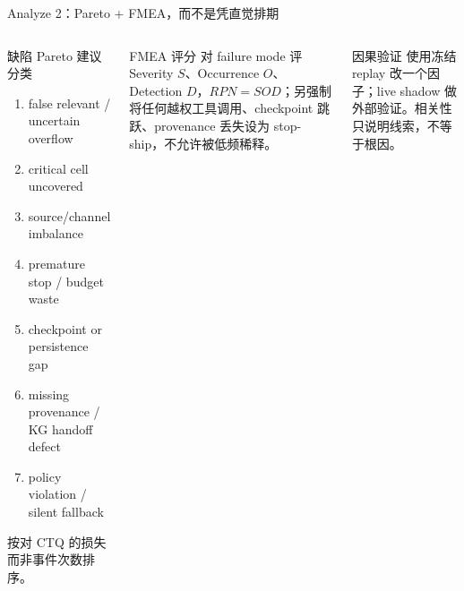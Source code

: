 \begin{frame}{Analyze 2：Pareto + FMEA，而不是凭直觉排期}
\begin{columns}[T,onlytextwidth]
\begin{block}{缺陷 Pareto 建议分类}
\begin{enumerate}
  \item false relevant / uncertain overflow
  \item critical cell uncovered
  \item source/channel imbalance
  \item premature stop / budget waste
  \item checkpoint or persistence gap
  \item missing provenance / KG handoff defect
  \item policy violation / silent fallback
\end{enumerate}
按对 CTQ 的损失而非事件次数排序。
\end{block}
\begin{block}{FMEA 评分}
对 failure mode 评 Severity $S$、Occurrence $O$、Detection $D$，$RPN=SOD$；另强制将任何越权工具调用、checkpoint 跳跃、provenance 丢失设为 stop-ship，不允许被低频稀释。
\end{block}
\begin{alertblock}{因果验证}
使用冻结 replay 改一个因子；live shadow 做外部验证。相关性只说明线索，不等于根因。
\end{alertblock}
\end{columns}
\end{frame}


